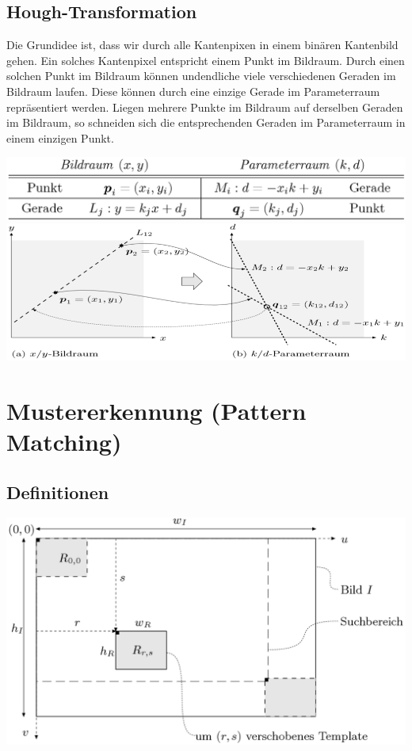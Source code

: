 \documentclass[10pt]{article}
\begin{document}
\subsection{Hough-Transformation}
Die Grundidee ist, dass wir durch alle Kantenpixen in einem binären Kantenbild gehen. Ein solches Kantenpixel entspricht einem Punkt im Bildraum. Durch einen solchen Punkt im Bildraum können undendliche viele verschiedenen Geraden im Bildraum laufen. Diese können durch eine einzige Gerade im Parameterraum repräsentiert werden. Liegen mehrere Punkte im Bildraum auf derselben Geraden im Bildraum, so schneiden sich die entsprechenden Geraden im Parameterraum in einem einzigen Punkt.
\begin{center}
	\includegraphics[scale=0.25]{ht-geraden.png} \\
	\includegraphics[scale=0.25]{ht-geraden-2.png}
\end{center}

\pagebreak
\section{Mustererkennung (Pattern Matching)}

\subsection{Definitionen}
\begin{center}
	\includegraphics[scale=0.3]{pm-definitionen.png}
\end{center}
\end{document}
